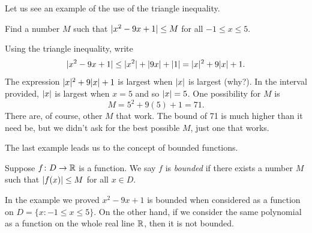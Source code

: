 Let us see an example of the use of the triangle inequality.

\begin{example}
Find a number $M$ such that $\lvert {x^2-9x+1} \rvert \leq M$ for all $-1 \leq x \leq
5$.

Using the triangle inequality, write
\begin{equation*}
\lvert {x^2-9x+1} \rvert \leq \lvert {x^2} \rvert+\lvert {9x} \rvert+\lvert {1} \rvert
=
\lvert {x} \rvert^2+9\lvert {x} \rvert+1 .
\end{equation*}
The expression
$\lvert {x} \rvert^2+9\lvert {x} \rvert+1$ is largest when $\left\lvert {x} \right\rvert$ is largest (why?).  In the interval
provided, $\left\lvert {x} \right\rvert$ is largest when $x=5$ and so $\left\lvert {x} \right\rvert=5$.  One
possibility for $M$ is
\begin{equation*}
M = 5^2+9(5)+1 = 71 .
\end{equation*}
There are, of course, other $M$ that work.  The bound of 71
is much higher than it
need be, but we didn't ask for the best possible $M$, just one that works.
\end{example}

The last example leads us to the concept of bounded functions.

\begin{defn}
Suppose $f \colon D \to {\mathbb{R}}$ is a function.  We say $f$ is
\emph{bounded}
if there exists a number $M$
such that $\left\lvert {f(x)} \right\rvert \leq M$ for all $x \in D$.
\end{defn}

In the example we proved $x^2-9x+1$ is bounded when considered as a
function on $D = \{ x : -1 \leq x \leq 5 \}$.   On the other hand,
if we consider the same polynomial as a function on the whole real line ${\mathbb{R}}$,
then it is not bounded.

